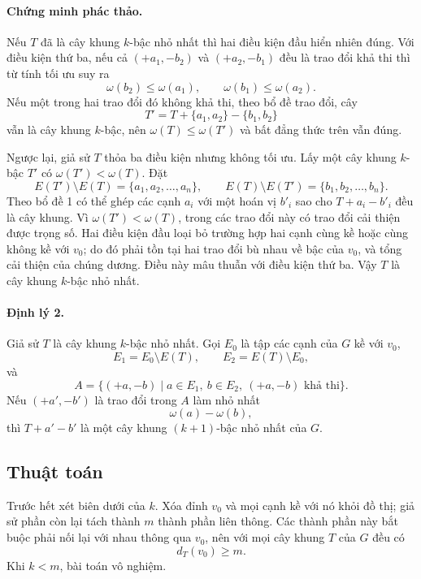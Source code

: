 \documentclass[11pt]{article}
\begin{document}
\paragraph{Chứng minh phác thảo.}
Nếu $T$ đã là cây khung $k$-bậc nhỏ nhất thì hai điều kiện đầu hiển nhiên đúng.
Với điều kiện thứ ba, nếu cả $(+a_1,-b_2)$ và $(+a_2,-b_1)$ đều là trao đổi
khả thi thì từ tính tối ưu suy ra
\[
  \omega(b_2)\le \omega(a_1),\qquad \omega(b_1)\le \omega(a_2).
\]
Nếu một trong hai trao đổi đó không khả thi, theo bổ đề trao đổi, cây
\[
  T'=T+\{a_1,a_2\}-\{b_1,b_2\}
\]
vẫn là cây khung $k$-bậc, nên $\omega(T)\le \omega(T')$ và bất đẳng thức trên
vẫn đúng.

Ngược lại, giả sử $T$ thỏa ba điều kiện nhưng không tối ưu. Lấy một cây khung
$k$-bậc $T'$ có $\omega(T')<\omega(T)$. Đặt
\[
  E(T')\setminus E(T)=\{a_1,a_2,\ldots,a_n\},\qquad
  E(T)\setminus E(T')=\{b_1,b_2,\ldots,b_n\}.
\]
Theo bổ đề 1 có thể ghép các cạnh $a_i$ với một hoán vị $b'_i$ sao cho
$T+a_i-b'_i$ đều là cây khung. Vì $\omega(T')<\omega(T)$, trong các trao đổi
này có trao đổi cải thiện được trọng số. Hai điều kiện đầu loại bỏ trường hợp
hai cạnh cùng kề hoặc cùng không kề với $v_0$; do đó phải tồn tại hai trao đổi
bù nhau về bậc của $v_0$, và tổng cải thiện của chúng dương. Điều này mâu
thuẫn với điều kiện thứ ba. Vậy $T$ là cây khung $k$-bậc nhỏ nhất.

\paragraph{Định lý 2.}
Giả sử $T$ là cây khung $k$-bậc nhỏ nhất. Gọi $E_0$ là tập các cạnh của $G$ kề
với $v_0$,
\[
  E_1=E_0\setminus E(T),\qquad
  E_2=E(T)\setminus E_0,
\]
và
\[
  A=\{(+a,-b)\mid a\in E_1,\ b\in E_2,\ (+a,-b)\text{ khả thi}\}.
\]
Nếu $(+a',-b')$ là trao đổi trong $A$ làm nhỏ nhất
\[
  \omega(a)-\omega(b),
\]
thì $T+a'-b'$ là một cây khung $(k+1)$-bậc nhỏ nhất của $G$.

\subsection{Thuật toán}

Trước hết xét biên dưới của $k$. Xóa đỉnh $v_0$ và mọi cạnh kề với nó khỏi
đồ thị; giả sử phần còn lại tách thành $m$ thành phần liên thông. Các thành
phần này bắt buộc phải nối lại với nhau thông qua $v_0$, nên với mọi cây khung
$T$ của $G$ đều có
\[
  d_T(v_0)\ge m.
\]
Khi $k<m$, bài toán vô nghiệm.
\end{document}
